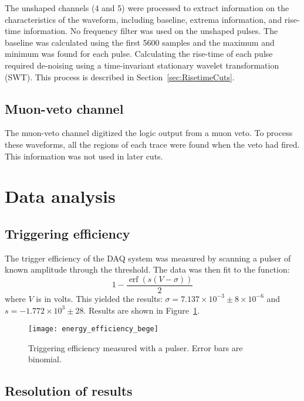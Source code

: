 The unshaped channels (4 and 5) were processed to extract information on the characteristics of the waveform, including baseline, extrema information, and rise-time information.  No frequency filter was used on the unshaped pulses.  The baseline was calculated using the first 5600 samples and the maximum and minimum was found for each pulse.  Calculating the rise-time of each pulse required de-noising using a time-invariant stationary wavelet transformation (SWT).  This process is described in Section~\ref{sec:RisetimeCuts}.

		\subsection{Muon-veto channel}
		\label{sec:MuonProc}

The muon-veto channel digitized the logic output from a muon veto.  To process these waveforms, all the regions of each trace were found when the veto had fired.  This information was not used in later cuts.


	\section{Data analysis}
	\label{sec:BeGeDataAnalysis}
		\subsection{Triggering efficiency}
		\label{sec:BeGeTrigEff}

The trigger efficiency of the DAQ system was measured by scanning a pulser of known amplitude through the threshold.  The data was then fit to the function:
			\[
			1 - \frac{\operatorname{erf} \left(s(V-\sigma)\right)}{2}
			\]
where $V$ is in volts.  This yielded the results: $\sigma = 7.137\times10^{-3}\pm8\times10^{-6}$ and $s = -1.772\times10^{3}\pm28$.  Results are shown in Figure~\ref{fig:BeGeTriggeringEfficiency}.

			\begin{figure}
				\centering
				\texttt{[image: energy\_efficiency\_bege]}
				\caption{Triggering efficiency measured with a pulser.  Error bars are binomial.}
				\label{fig:BeGeTriggeringEfficiency}
			\end{figure}

		\subsection{Resolution of results}

